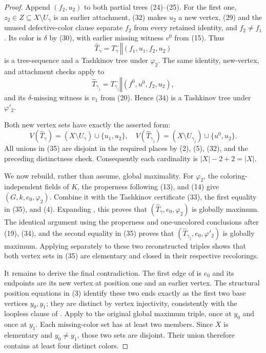 \begin{proof}
Append $(f_2,u_2)$ to both partial trees (24)--(25).  For the first one,
$z_2\in Z\subseteq X\setminus U_\gamma$ is an earlier attachment,
(32) makes $u_2$ a new vertex, (29) and the unused defective-color clause
separate $f_2$ from every retained identity, and $f_2\ne f_1$.  Its color
is $\delta$ by (30), with earlier missing witness $v^0$ from (15).  Thus
\[
 \widehat T_\gamma
  =T^-_\gamma\mathbin{\Vert}(f_1,u_1,f_2,u_2)                \tag{33}
\]
is a tree-sequence and a Tashkinov tree under $\varphi_2$.  The same
identity, new-vertex, and attachment checks apply to
\[
 \widehat T_{\gamma_j}
  =T^-_{\gamma_j}\mathbin{\Vert}(f^0,u^0,f_2,u_2),           \tag{34}
\]
and its $\delta$-missing witness is $v_1$ from (20).  Hence (34) is a
Tashkinov tree under $\varphi'_2$.

Both new vertex sets have exactly the asserted form:
\[
 V(\widehat T_\gamma)=(X\setminus U_\gamma)\cup\{u_1,u_2\},
 \quad
 V(\widehat T_{\gamma_j})=(X\setminus U_{\gamma_j})
    \cup\{u^0,u_2\}.                                       \tag{35}
\]
All unions in (35) are disjoint in the required places by (2), (5),
(32), and the preceding distinctness check.  Consequently each cardinality
is $|X|-2+2=|X|$.

We now rebuild, rather than assume, global maximality.  For $\varphi_2$,
the coloring-independent fields of $K$, the properness following (13),
and (14) give $(G,k,e_0,\varphi_2)$.  Combine it with
the Tashkinov certificate (33), the first equality in (35), and (4).
Expanding , this proves that
$(\widehat T_\gamma,e_0,\varphi_2)$ is globally maximum.  The identical
argument using the properness and one-uncolored conclusions after (19),
(34), and the second equality in (35) proves that
$(\widehat T_{\gamma_j},e_0,\varphi'_2)$ is globally maximum.  Applying
 separately to these two reconstructed
triples shows that both vertex sets in (35) are elementary and closed in
their respective recolorings.

It remains to derive the final contradiction.  The first edge of
 is $e_0$ and its endpoints are its new vertex at
position one and an earlier vertex.  The structural position equations
in (3) identify these two ends exactly as the first two base vertices
$y_0,y_1$; they are distinct by vertex injectivity, consistently with
the loopless clause of .  Apply
 to the original global
maximum triple, once at $y_0$ and once at $y_1$.  Each missing-color set
has at least two members.  Since $X$ is elementary and $y_0\ne y_1$,
those two sets are disjoint.  Their union therefore contains at least four
distinct colors.


\end{proof}
